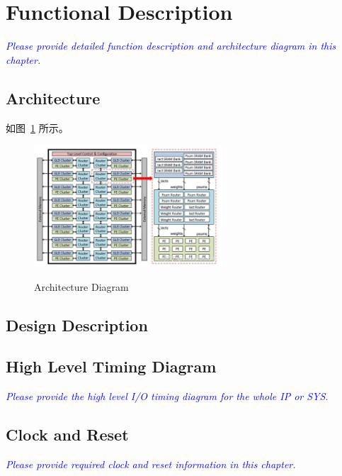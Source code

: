 
\clearpage

\section{Functional Description}
\noindent\textit{\textcolor{blue}{Please provide detailed function description and architecture diagram in this chapter.}}

\subsection{Architecture}

如图~\ref{fig.googles} 所示。

\begin{figure}[ht]
    \centering
    \includegraphics[width=7cm]{figure/eyerissv2.jpg} \\
    \caption{Architecture Diagram} 
   \label{fig.googles}
\end{figure}

\subsection{Design Description}

\subsection{High Level Timing Diagram}
\noindent\textit{\textcolor{blue}{Please provide the high level I/O timing diagram for the whole IP or SYS.}}

\subsection{Clock and Reset}
\noindent\textit{\textcolor{blue}{Please provide required clock and reset information in this chapter.}}

